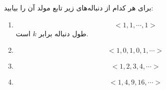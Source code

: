 \EXERCISE
برای هر کدام از دنباله‌های زیر تابع مولد آن را بیابید:
\begin{enumerate}
\item
$$<1, 1, \cdots, 1>$$
طول دنباله برابر
$k$
است.
\item
$$<1, 0, 1, 0, 1, \cdots>$$
\item
$$<1, 2, 3, 4, \cdots>$$
\item
$$<1, 4, 9, 16, \cdots>$$
\end{enumerate}